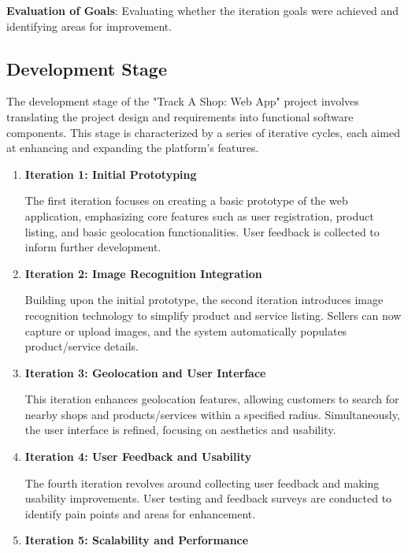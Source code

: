 \textbf{Evaluation of Goals}:
Evaluating whether the iteration goals were achieved and identifying areas for improvement.

\pagebreak

\subsection{Development Stage}

The development stage of the "Track A Shop: Web App" project involves translating the project design and requirements into functional software components. This stage is characterized by a series of iterative cycles, each aimed at enhancing and expanding the platform's features.

\begin{enumerate}
	\item \textbf{Iteration 1: Initial Prototyping}
	
	The first iteration focuses on creating a basic prototype of the web application, emphasizing core features such as user registration, product listing, and basic geolocation functionalities. User feedback is collected to inform further development.
	
	\item \textbf{Iteration 2: Image Recognition Integration}
	
	Building upon the initial prototype, the second iteration introduces image recognition technology to simplify product and service listing. Sellers can now capture or upload images, and the system automatically populates product/service details.
	
	\item \textbf{Iteration 3: Geolocation and User Interface}
	
	This iteration enhances geolocation features, allowing customers to search for nearby shops and products/services within a specified radius. Simultaneously, the user interface is refined, focusing on aesthetics and usability.
	
	\item \textbf{Iteration 4: User Feedback and Usability}
	
	The fourth iteration revolves around collecting user feedback and making usability improvements. User testing and feedback surveys are conducted to identify pain points and areas for enhancement.
	
	\item \textbf{Iteration 5: Scalability and Performance}
	

\end{enumerate}
